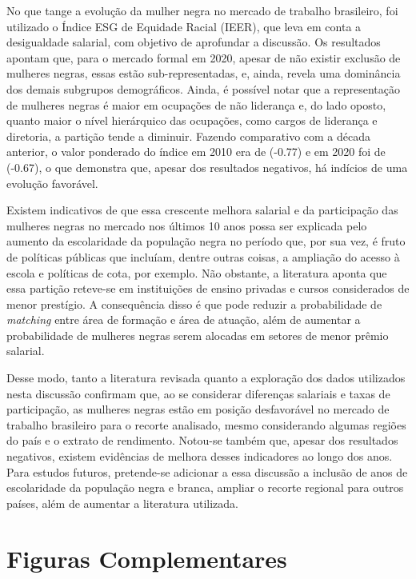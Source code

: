 \documentclass[12pt]{article}
\begin{document}
\par No que tange a evolução da mulher negra no mercado de trabalho brasileiro, foi utilizado o Índice ESG de Equidade Racial (IEER), que leva em conta a desigualdade salarial, com objetivo de aprofundar a discussão. Os resultados apontam que, para o mercado formal em 2020,  apesar de não existir exclusão de mulheres negras, essas estão sub-representadas, e, ainda, revela uma dominância dos demais subgrupos demográficos. Ainda, é possível notar que a representação de mulheres negras é maior em ocupações de não liderança e, do lado oposto, quanto maior o nível hierárquico das ocupações, como cargos de liderança e diretoria, a partição tende a diminuir. Fazendo comparativo com a década anterior, o valor ponderado do índice em 2010 era de (-0.77) e em 2020 foi de (-0.67), o que demonstra que, apesar dos resultados negativos,  há indícios de uma evolução favorável. \par Existem indicativos de que essa crescente melhora salarial e da participação das mulheres negras no mercado nos últimos 10 anos possa ser explicada pelo aumento da escolaridade da população negra no período que, por sua vez, é fruto de políticas públicas que incluíam, dentre  outras coisas, a ampliação do acesso à escola e políticas de cota, por exemplo. Não obstante, a literatura aponta que essa partição reteve-se em instituições de ensino privadas e cursos considerados de menor prestígio. A consequência disso é que pode reduzir a probabilidade de \textit{matching} entre área de formação e área de atuação, além de aumentar a probabilidade de mulheres negras serem alocadas em setores de menor prêmio salarial.

\par Desse modo, tanto a literatura revisada quanto a exploração dos dados utilizados nesta discussão confirmam que, ao se considerar diferenças salariais e taxas de participação, as mulheres negras estão em posição desfavorável no mercado de trabalho brasileiro para o recorte analisado, mesmo considerando algumas regiões do país e o extrato de rendimento. Notou-se também que, apesar dos resultados negativos, existem evidências de melhora desses indicadores ao longo dos anos. Para estudos futuros, pretende-se adicionar a essa discussão a inclusão de anos de escolaridade da população negra e branca, ampliar o recorte regional para outros países, além de aumentar a literatura utilizada.

\clearpage

\appendix

\section*{Figuras Complementares} \label{fig_comp}
\end{document}
